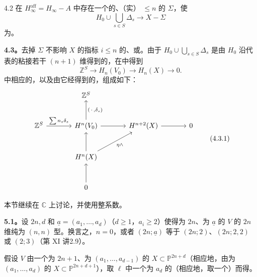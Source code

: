 \begin{SGAresult}{}{4.2}
在 $H_\infty^{\mathrm{aff}}=H_\infty-A$ 中存在一个的、（实） $\leq n$ 的 $\Sigma$，使
\[
H_0\cup\bigcup_{s\in S}\Delta_s\longrightarrow X-\Sigma
\]
为。
\end{SGAresult}

\textbf{4.3。}去掉 $\Sigma$ 不影响 $X$ 的指标 $i\leq n$ 的、或。由于 $H_0\cup\bigcup_{s\in S}\Delta_s$ 是由 $H_0$ 沿代表的粘接若干 $(n+1)$ 维得到的，在中得到
\[
\mathbb Z^S\longrightarrow H_n(V_0)\longrightarrow H_n(X)\longrightarrow0.
\]
中相应的，以及由它经得到的，组成如下：
\begin{equation}
\begin{tikzcd}[column sep=large,row sep=large]
 & \mathbb Z^S & & \\
\mathbb Z^S\arrow[r,"{\sum n_s\delta_s}"] & H^n(V_0)\arrow[u,"{(\,\cdot\,,\delta_s)}"']\arrow[r] & H^{n+2}(X)\arrow[r] & 0\\
 & H^n(X)\arrow[u]\arrow[ur,"{\eta\wedge}"'] & & \\
 & 0\arrow[u] & &
\end{tikzcd}
\tag{4.3.1}
\end{equation}

本节继续在 $\mathbb C$ 上讨论，并使用整系数。

\textbf{5.1。}设 $2n,d$ 和 $\underline a=(a_1,\ldots,a_d)$（$d\geq1$，$a_i\geq2$）使得为 $2n$、为 $\underline a$ 的 $V$ 的 $2n$ 维纯为 $(n,n)$ 型。换言之，$n=0$，或者 $(2n;\underline a)$ 等于 $(2n;2)$、$(2n;2,2)$ 或 $(2;3)$（第 XI 讲2.9）。

假设 $V$ 由一个为 $2n+1$、为 $(a_1,\ldots,a_{d-1})$ 的 $X\subset\mathbb P^{2n+d}$（相应地，由为 $(a_1,\ldots,a_d)$ 的 $X\subset\mathbb P^{2n+d+1}$），取 $\ell$ 中一个为 $a_d$ 的（相应地，取一个）而得。

